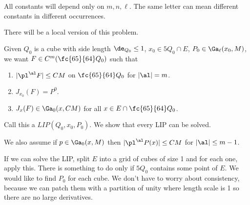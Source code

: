 All constants will depend only on $m,n,\ell$. The same letter can mean different constants in different occurrences.

There will be a local version of this problem.


Given $Q_0$ is a cube with side length $\de_{Q_0}\le 1$, $x_0\in 5Q_0\cap E$, $P_0\in \Ga_\ell(x_0,M)$, we want $F\in C^m(\fc{65}{64} Q_0)$ such that 
\begin{enumerate}
\item
$|\pl^\al F|\le CM$ on $\fc{65}{64}Q_0$ for $|\al|=m$.
\item
$J_{x_0}(F)=P^0$.
\item
$J_x(F)\in \Ga_0(x,CM)$ for all $x\in E\cap \fc{65}{64}Q_0$.
\end{enumerate}
Call this a  $LIP(Q_0,x_0,P_0)$. We show that every LIP can be solved.

We also assume if $p\in \Ga_0(x,M)$ then $|\pl^\al P(x)|\le CM$ for $|\al|\le m-1$. 

If we can solve the LIP, split $E$ into a grid of cubes of size 1 and for each one, apply this.
There is something to do only if $5Q_0$ contains some point of $E$. %
We would like  to find $P_0$ for each cube. We don't have to worry about consistency, because we can patch them with a partition of unity where length scale is 1 so there are no large derivatives.


